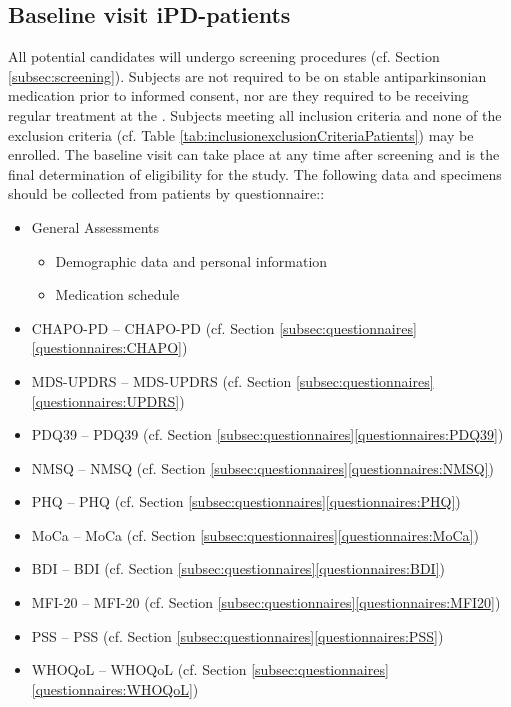 \subsection{Baseline visit \ac{iPD}-patients}
All potential candidates will undergo screening procedures (cf. Section \ref{subsec:screening}). Subjects are not required to be on stable antiparkinsonian medication prior to informed consent, nor are they required to be receiving regular treatment at the \UKGM. Subjects meeting all inclusion criteria and none of the exclusion criteria (cf. Table \ref{tab:inclusionexclusionCriteriaPatients}) may be enrolled. The baseline visit can take place at any time after screening and is the final determination of eligibility for the study. The following data and specimens should be collected from patients by questionnaire::
\begin{itemize}[noitemsep,topsep=0pt]
\item General Assessments
\begin{itemize}[noitemsep,topsep=0pt]
\item Demographic data and personal information
\item Medication schedule
\end{itemize}
\item \acl{CHAPO-PD} -- \acs{CHAPO-PD} (cf. Section \ref{subsec:questionnaires}\ref{questionnaires:CHAPO})
\item \acl{MDS-UPDRS} -- \acs{MDS-UPDRS} (cf. Section \ref{subsec:questionnaires}\ref{questionnaires:UPDRS})
\item \acl{PDQ39} -- \acs{PDQ39} (cf. Section \ref{subsec:questionnaires}\ref{questionnaires:PDQ39})
\item \acl{NMSQ} -- \acs{NMSQ} (cf. Section \ref{subsec:questionnaires}\ref{questionnaires:NMSQ})
\item \acl{PHQ} -- \acs{PHQ} (cf. Section \ref{subsec:questionnaires}\ref{questionnaires:PHQ})
\item \acl{MoCa} -- \acs{MoCa} (cf. Section \ref{subsec:questionnaires}\ref{questionnaires:MoCa})
\item \acl{BDI} -- \acs{BDI} (cf. Section \ref{subsec:questionnaires}\ref{questionnaires:BDI})
\item \acl{MFI-20} -- \acs{MFI-20} (cf. Section \ref{subsec:questionnaires}\ref{questionnaires:MFI20})
\item \acl{PSS} -- \acs{PSS} (cf. Section \ref{subsec:questionnaires}\ref{questionnaires:PSS})
\item \acl{WHOQoL} -- \acs{WHOQoL} (cf. Section \ref{subsec:questionnaires}\ref{questionnaires:WHOQoL})

\end{itemize}
